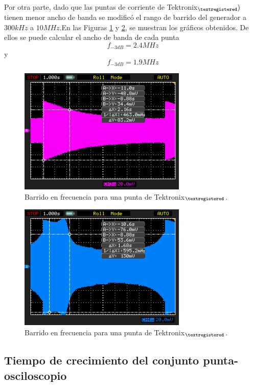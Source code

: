 \documentclass[a4paper,10pt]{article}
\begin{document}
		\indent Por otra parte, dado que las puntas de corriente de 
		Tektronix$_{\textregistered} )$ tienen menor ancho de banda se 
		modific\'o el rango de barrido del generador a $300kHz$ a $10MHz$.En 
		las Figuras \ref{img006} y \ref{img007}, se muestran los gr\'aficos 
		obtenidos. De ellos se puede calcular el ancho de banda de cada punta
		$$f_{-3dB}=2.4MHz$$ y $$f_{-3dB}=1.9MHz$$
		
		\begin{figure}[!htb]
			\centering
			\includegraphics[width=8cm]
			{Imagenes/Mediciones instrumentos/NewFile7.png}
			\caption{Barrido en frecuencia para una punta de 
			Tektronix$_{\textregistered}$.} \label{img006}
		\end{figure}		
	
		\begin{figure}[!htb]
			\centering
			\includegraphics[width=8cm]
			{Imagenes/Mediciones instrumentos/NewFile8.png}
			\caption{Barrido en frecuencia para una punta de 
			Tektronix$_{\textregistered}$.} \label{img007}
		\end{figure}
		
		\subsection{Tiempo de crecimiento del conjunto punta-osciloscopio}
		
\end{document}
